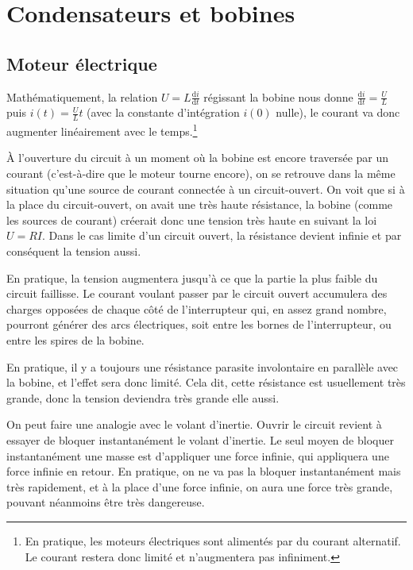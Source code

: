 \documentclass{article}
\begin{document}
\section{Condensateurs et bobines}

\subsection{Moteur électrique}

Mathématiquement, la relation $U=L\frac{\text{d}i}{\text{d}t}$ régissant la bobine nous donne $\frac{\text{d}i}{\text{d}t}=\frac{U}{L}$ puis $i(t)=\frac{U}{L}t$ (avec la constante d'intégration $i(0)$ nulle), le courant va donc augmenter linéairement avec le temps.\footnote{En pratique, les moteurs électriques sont alimentés par du courant alternatif. Le courant restera donc limité et n'augmentera pas infiniment.}

À l'ouverture du circuit à un moment où la bobine est encore traversée par un courant (c'est-à-dire que le moteur tourne encore), on se retrouve dans la même situation qu'une source de courant connectée à un circuit-ouvert. On voit que si à la place du circuit-ouvert, on avait une très haute résistance, la bobine (comme les sources de courant) créerait donc une tension très haute en suivant la loi $U=RI$. Dans le cas limite d'un circuit ouvert, la résistance devient infinie et par conséquent la tension aussi.

En pratique, la tension augmentera jusqu'à ce que la partie la plus faible du circuit faillisse. Le courant voulant passer par le circuit ouvert accumulera des charges opposées de chaque côté de l'interrupteur qui, en assez grand nombre, pourront générer des arcs électriques, soit entre les bornes de l'interrupteur, ou entre les spires de la bobine.

En pratique, il y a toujours une résistance parasite involontaire en parallèle avec la bobine, et l'effet sera donc limité. Cela dit, cette résistance est usuellement très grande, donc la tension deviendra très grande elle aussi.

On peut faire une analogie avec le volant d'inertie. Ouvrir le circuit revient à essayer de bloquer instantanément le volant d'inertie. Le seul moyen de bloquer instantanément une masse est d'appliquer une force infinie, qui appliquera une force infinie en retour. En pratique, on ne va pas la bloquer instantanément mais très rapidement, et à la place d'une force infinie, on aura une force très grande, pouvant néanmoins être très dangereuse.
\end{document}
